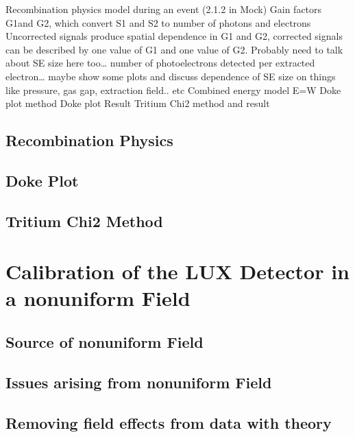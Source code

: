 \documentclass[a4paper,12pt]{article}
\begin{document}
{%

Recombination physics model  during an event (2.1.2 in Mock)
Gain factors G1and G2, which convert S1 and S2 to number of photons and electrons
Uncorrected signals produce spatial dependence in G1 and G2, corrected signals can be described by one value of G1 and one value of G2.  
Probably need to talk about SE size here too… number of photoelectrons detected per extracted electron… maybe show some plots and discuss dependence of SE size on things like pressure, gas gap, extraction field.. etc
	Combined energy model E=W
	Doke plot method
	Doke plot Result
	Tritium Chi2 method and result


\subsection{Recombination Physics} \label{RecombSec} 
\subsection{Doke Plot}
\subsection{Tritium Chi2 Method}


\section{Calibration of the LUX Detector in a nonuniform Field} \label{Run04Corrections}


\subsection{Source of nonuniform Field}
\subsection{Issues arising from nonuniform Field}
\subsection{Removing field effects from data with theory}
}
\end{document}
